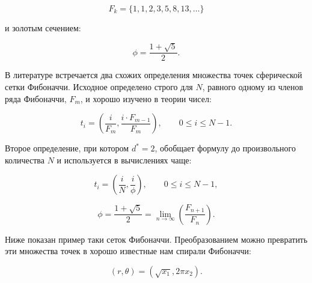 \documentclass[12pt, a4paper]{article}
\begin{document}
\begin{displaymath}
    F_k = \{1, 1, 2, 3, 5, 8, 13, \ldots \}
\end{displaymath}

\noindent и золотым сечением:

\begin{displaymath}
    \phi = \frac{1 + \sqrt{5}}{2}.
\end{displaymath}

В литературе встречается два схожих определения множества точек сферической сетки Фибоначчи. Исходное определено строго для $N$, равного одному из членов ряда Фибоначчи, $F_m$, и хорошо изучено в теории чисел:

\begin{displaymath}
    t_i = \left( \frac{i}{F_m}, \frac{i \cdot F_{m-1}}{F_m} \right),
    \qquad
    0 \leq i \leq N-1.
\end{displaymath}

Второе определение, при котором $d^* = 2$, обобщает формулу до произвольного количества $N$ и используется в вычислениях чаще:

\begin{displaymath}
    t_i = \left( \frac{i}{N}, \frac{i}{\phi} \right),
    \qquad
    0 \leq i \leq N-1,
    \tag{1}
\end{displaymath}

\begin{displaymath}
    \phi = \frac{1 + \sqrt{5}}{2} = \lim_{n \rightarrow \infty} \left( \frac{F_{n+1}}{F_n} \right).
\end{displaymath}

Ниже показан пример таки сеток Фибоначчи. Преобразованием можно превратить эти множества точек в хорошо известные нам спирали Фибоначчи:

\begin{displaymath}
    (r, \theta) = (\sqrt{x_1}, 2 \pi x_2).
\end{displaymath}
\end{document}
